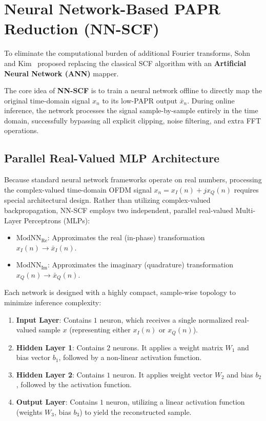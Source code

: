 \section{Neural Network-Based PAPR Reduction (NN-SCF)}
\label{sec:nnscf_framework}

To eliminate the computational burden of additional Fourier transforms, Sohn and Kim~\cite{sohn2015neural} proposed replacing the classical SCF algorithm with an \textbf{Artificial Neural Network (ANN)} mapper.

The core idea of \textbf{NN-SCF} is to train a neural network offline to directly map the original time-domain signal $x_n$ to its low-PAPR output $\bar{x}_n$. During online inference, the network processes the signal sample-by-sample entirely in the time domain, successfully bypassing all explicit clipping, noise filtering, and extra FFT operations.

\subsection{Parallel Real-Valued MLP Architecture}

Because standard neural network frameworks operate on real numbers, processing the complex-valued time-domain OFDM signal $x_n = x_I(n) + j x_Q(n)$ requires special architectural design. Rather than utilizing complex-valued backpropagation, NN-SCF employs two independent, parallel real-valued Multi-Layer Perceptrons (MLPs):
\begin{itemize}
    \item $\mathrm{ModNN}_{\mathrm{Re}}$: Approximates the real (in-phase) transformation $x_I(n) \to \bar{x}_I(n)$.
    \item $\mathrm{ModNN}_{\mathrm{Im}}$: Approximates the imaginary (quadrature) transformation $x_Q(n) \to \bar{x}_Q(n)$.
\end{itemize}

Each network is designed with a highly compact, sample-wise topology to minimize inference complexity:
\begin{enumerate}
    \item \textbf{Input Layer}: Contains $1$ neuron, which receives a single normalized real-valued sample $x$ (representing either $x_I(n)$ or $x_Q(n)$).
    \item \textbf{Hidden Layer 1}: Contains $2$ neurons. It applies a weight matrix $W_1$ and bias vector $b_1$, followed by a non-linear activation function.
    \item \textbf{Hidden Layer 2}: Contains $1$ neuron. It applies weight vector $W_2$ and bias $b_2$, followed by the activation function.
    \item \textbf{Output Layer}: Contains $1$ neuron, utilizing a linear activation function (weights $W_3$, bias $b_3$) to yield the reconstructed sample.
\end{enumerate}

